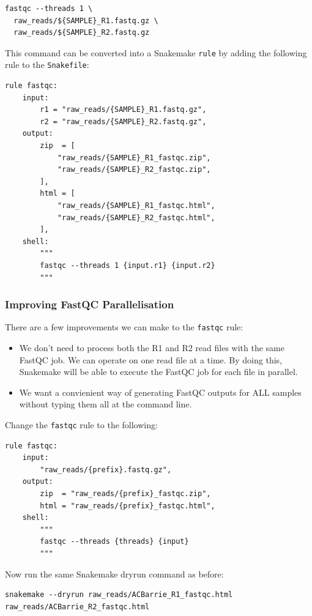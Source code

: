 \begin{lstlisting}
fastqc --threads 1 \
  raw_reads/${SAMPLE}_R1.fastq.gz \
  raw_reads/${SAMPLE}_R2.fastq.gz
\end{lstlisting}

This command can be converted into a Snakemake \texttt{rule} by adding the following rule to the \texttt{Snakefile}:

\begin{lstlisting}
rule fastqc:
	input:
		r1 = "raw_reads/{SAMPLE}_R1.fastq.gz",
		r2 = "raw_reads/{SAMPLE}_R2.fastq.gz",
	output:
		zip  = [
			"raw_reads/{SAMPLE}_R1_fastqc.zip",
			"raw_reads/{SAMPLE}_R2_fastqc.zip",
		],
		html = [
			"raw_reads/{SAMPLE}_R1_fastqc.html",
			"raw_reads/{SAMPLE}_R2_fastqc.html",
		],
	shell:
		"""
		fastqc --threads 1 {input.r1} {input.r2}
		"""
\end{lstlisting}

\subsubsection{Improving FastQC Parallelisation}

There are a few improvements we can make to the \texttt{fastqc} rule:

\begin{itemize}
  \item We don't need to process both the R1 and R2 read files with the same FastQC job. We can operate on one read file at a time.
        By doing this, Snakemake will be able to execute the FastQC job for each file in parallel.
  \item We want a convienient way of generating FastQC outputs for ALL samples without typing them all at the command line.
\end{itemize}

Change the \texttt{fastqc} rule to the following:

\begin{lstlisting}
rule fastqc:
	input:
		"raw_reads/{prefix}.fastq.gz",
	output:
		zip  = "raw_reads/{prefix}_fastqc.zip",
		html = "raw_reads/{prefix}_fastqc.html",
	shell:
		"""
		fastqc --threads {threads} {input}
		"""
\end{lstlisting}

Now run the same Snakemake dryrun command as before:

\begin{lstlisting}
snakemake --dryrun raw_reads/ACBarrie_R1_fastqc.html raw_reads/ACBarrie_R2_fastqc.html
\end{lstlisting}

